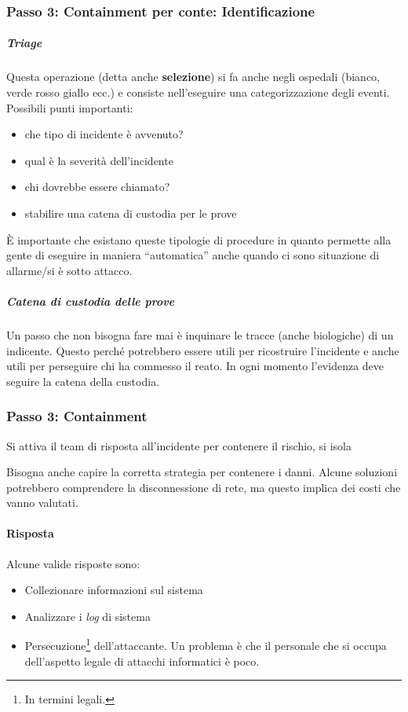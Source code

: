 \subsubsection{Passo 3: Containment per conte: Identificazione}
\subparagraph*{Triage} Questa operazione (detta anche \textbf{selezione}) si fa
anche negli ospedali (bianco, verde rosso giallo ecc.) e consiste nell'eseguire
una categorizzazione degli eventi. Possibili punti importanti:
\begin{itemize}
\item che tipo di incidente è avvenuto?
\item qual è la severità dell'incidente
\item chi dovrebbe essere chiamato?
\item stabilire una catena di custodia per le prove
\end{itemize}
È importante che esistano queste tipologie di procedure in quanto permette alla
gente di eseguire in maniera ``automatica'' anche quando ci sono situazione di
allarme/si è sotto attacco.

\subparagraph*{Catena di custodia delle prove} Un passo che non bisogna fare mai
è inquinare le tracce (anche biologiche) di un indicente. Questo perché
potrebbero essere utili per ricostruire l'incidente e anche utili per perseguire
chi ha commesso il reato.
In ogni momento l'evidenza deve seguire la catena della custodia. %


\subsubsection{Passo 3: Containment}

Si attiva il team di risposta all'incidente per contenere il rischio, si
isola


Bisogna anche capire la corretta strategia per contenere i danni. Alcune
soluzioni potrebbero comprendere la disconnessione di rete, ma questo implica
dei costi che vanno valutati.



\paragraph*{Risposta}

Alcune valide risposte sono:
\begin{itemize}
\item Collezionare informazioni sul sistema
\item Analizzare i \textit{log} di sistema
\item Persecuzione\footnote{In termini legali.} dell'attaccante. Un problema è
che il personale che si occupa dell'aspetto legale di attacchi informatici è
poco.  %
\end{itemize}






